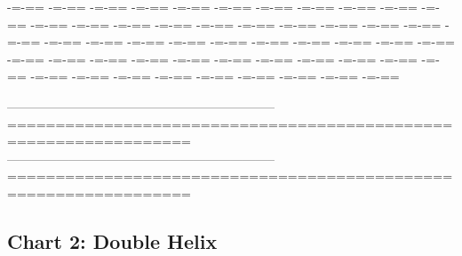 \documentclass[12pt]{article}
\newcommand{\rnfive}{\rnright\addtocounter{rownumber}{-4}} %
\begin{document}
{-=-==  -=-==  -=-==  -=-==  -=-==  -=-==  -=-==  -=-==  -=-==  -=-==  -=-==  -=-==  -=-==  
-=-==  -=-==  -=-==  -=-==  -=-==  -=-==  -=-==  -=-==  -=-==  -=-==  -=-==  -=-==  -=-==
-=-==  -=-==  -=-==  -=-==  -=-==  -=-==  -=-==  -=-==  -=-==  -=-==  -=-==  -=-==  -=-==
-=-==  -=-==  -=-==  -=-==  -=-==  -=-==  -=-==  -=-==  -=-==  -=-==  -=-==  -=-==  -=-==
\overline*{-=-==  -=-==  -=-==  -=-==  -=-==  -=-==  -=-==  -=-==  -=-==  -=-==  -=-==  -=-==  -=-==}\rnfive \addtocounter{rownumber}{1}
-----------------------------------------------------------------
=================================================================
-----------------------------------------------------------------
================================================================= \rnright
}

{
\normalsize

\newpage
\subsection*{Chart 2: Double Helix}
}
\end{document}
